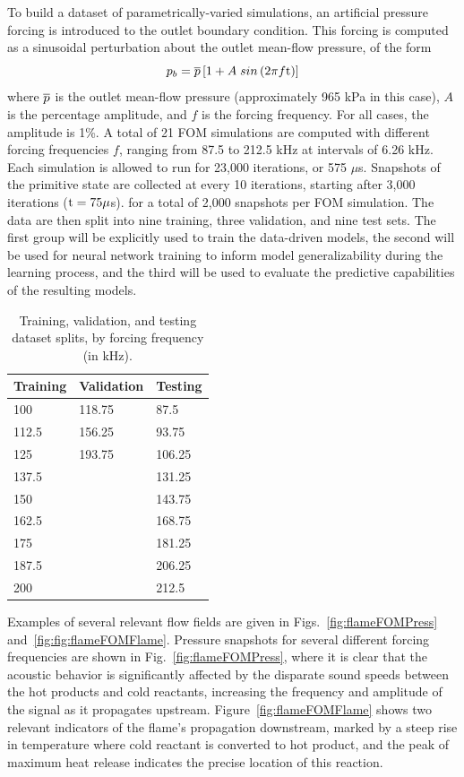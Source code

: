 To build a dataset of parametrically-varied simulations, an artificial pressure forcing is introduced to the outlet boundary condition. This forcing is computed as a sinusoidal perturbation about the outlet mean-flow pressure, of the form
%
\begin{equation}
	p_b = \overline{p} \left[1 + A \; sin\left(2 \pi f \text{t}\right)\right]
\end{equation}
%
where $\overline{p}$ is the outlet mean-flow pressure (approximately 965 kPa in this case), $A$ is the percentage amplitude, and $f$ is the forcing frequency. For all cases, the amplitude is 1\%. A total of 21 FOM simulations are computed with different forcing frequencies $f$, ranging from 87.5 to 212.5 kHz at intervals of 6.26 kHz. Each simulation is allowed to run for 23,000 iterations, or 575 $\mu$s. Snapshots of the primitive state are collected at every 10 iterations, starting after 3,000 iterations ($\text{t} = 75 \mu$s). for a total of 2,000 snapshots per FOM simulation. The data are then split into nine training, three validation, and nine test sets. The first group will be explicitly used to train the data-driven models, the second will be used for neural network training to inform model generalizability during the learning process, and the third will be used to evaluate the predictive capabilities of the resulting models.

\begin{table}
	\centering
	\begin{tabular}{ lll }
	\toprule
	Training & Validation & Testing  \\
	\midrule
	100   & 118.75 & 87.5 \\
	112.5 & 156.25 & 93.75 \\
	125   & 193.75 & 106.25 \\
	137.5 &        & 131.25 \\
	150   &        & 143.75 \\
	162.5 &        & 168.75 \\
	175   &        & 181.25 \\
	187.5 &        & 206.25 \\
	200   &        & 212.5 \\
	\bottomrule
	\end{tabular}
	\caption{\label{tab:trainSplit}Training, validation, and testing dataset splits, by forcing frequency (in kHz).}
\end{table}

Examples of several relevant flow fields are given in Figs.~\ref{fig:flameFOMPress} and~\ref{fig:fig:flameFOMFlame}. Pressure snapshots for several different forcing frequencies are shown in Fig.~\ref{fig:flameFOMPress}, where it is clear that the acoustic behavior is significantly affected by the disparate sound speeds between the hot products and cold reactants, increasing the frequency and amplitude of the signal as it propagates upstream. Figure~\ref{fig:flameFOMFlame} shows two relevant indicators of the flame's propagation downstream, marked by a steep rise in temperature where cold reactant is converted to hot product, and the peak of maximum heat release indicates the precise location of this reaction. 

